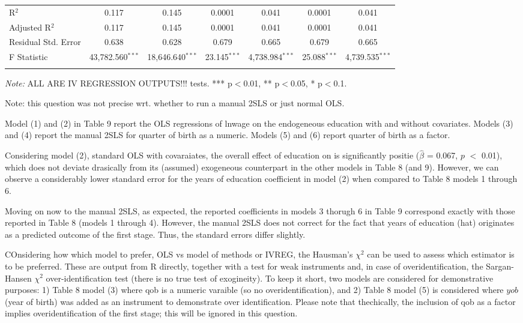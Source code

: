 \documentclass[a4paper]{article}
\begin{document}
\begin{table}[!htbp]
\begin{adjustwidth}{0.cm}{-0cm}
\begin{threeparttable}
\begin{tabular}{@{\extracolsep{-5pt}}lcccccc}
R$^{2}$ & 0.117 & 0.145 & 0.0001 & 0.041 & 0.0001 & 0.041 \\ 
Adjusted R$^{2}$ & 0.117 & 0.145 & 0.0001 & 0.041 & 0.0001 & 0.041 \\ 
Residual Std. Error & 0.638 & 0.628 & 0.679 & 0.665  & 0.679& 0.665  \\ 
F Statistic & 43,782.560$^{***}$ & 18,646.640$^{***}$  & 23.145$^{***}$  & 4,738.984$^{***}$ & 25.088$^{***}$ & 4,739.535$^{***}$ \\ 
\hline 
\hline \\[-3.5ex] 
\end{tabular} 
\begin{tablenotes}
      \small
      \item\textit{Note:} ALL ARE IV REGRESSION OUTPUTS!!! tests. *** p$<$0.01, ** p$<$0.05, * p$<$0.1.
    \end{tablenotes}
\end{threeparttable}
\end{adjustwidth}
%
\end{table}
Note: this question was not precise wrt. whether to run a manual 2SLS or just normal OLS.

Model (1) and (2) in Table 9 report the OLS regressions of lnwage on the endogeneous education with and without covariates. Models (3) and (4) report the manual 2SLS for quarter of birth as a numeric. Models (5) and (6) report quarter of birth as a factor. 

\indent Considering model (2), standard OLS with covaraiates, the overall effect of education on is significantly positie ($\hat{\beta}$ = 0.067, $p$ $<$ 0.01), which does not deviate drasically from its (assumed) exogeneous counterpart in the other models in Table 8 (and 9). However, we can observe a considerably lower standard error for the years of education coefficient in model (2) when compared to Table 8 models 1 through 6.

\indent Moving on now to the manual 2SLS, as expected, the reported coefficients in models 3 thorugh 6 in Table 9 correspond exactly with those reported in Table 8 (models 1 through 4). However, the manual 2SLS does not correct for the fact that years of education (hat) originates as a predicted outcome of the first stage. Thus, the standard errors differ slightly.

\indent COnsidering how which model to prefer, OLS vs model of methods or IVREG, the Hausman's ${\chi}^2$ can be used to assess which estimator is to be preferred. These are output from R directly, together with a test for weak instruments and, in case of overidentification, the Sargan-Hansen ${\chi}^2$ over-identification test (there is no true test of exogineity). To keep it short, two models are considered for demonstrative purposes: 1) Table 8 model (3) where qob is a numeric varaible (so no overidentification), and 2) Table 8 model (5) is considered where $yob$ (year of birth) was added as an instrument to demonstrate over identification. Please note that thechically, the inclusion of qob as a factor implies overidentification of the first stage; this will be ignored in this question.
\end{document}

